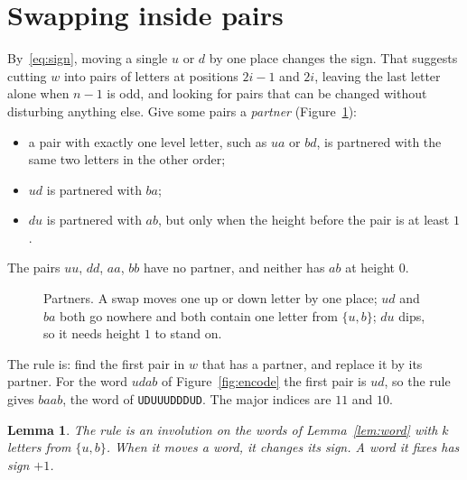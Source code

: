 \documentclass[11pt]{article}
\newtheorem{lemma}{Lemma}
\theoremstyle{remark}
\newcommand{\w}[1]{\texttt{#1}}
\begin{document}
\section{Swapping inside pairs}

By~\eqref{eq:sign}, moving a single $u$ or $d$ by one place changes the sign. That suggests cutting
$w$ into pairs of letters at positions $2i-1$ and $2i$, leaving the last letter alone when $n-1$ is
odd, and looking for pairs that can be changed without disturbing anything else. Give some pairs a
\emph{partner} (Figure~\ref{fig:partners}):
\begin{itemize}
\item a pair with exactly one level letter, such as $ua$ or $bd$, is partnered with the same two
letters in the other order;
\item $ud$ is partnered with $ba$;
\item $du$ is partnered with $ab$, but only when the height before the pair is at least $1$.
\end{itemize}
The pairs $uu$, $dd$, $aa$, $bb$ have no partner, and neither has $ab$ at height $0$.

\begin{figure}[ht]
\centering

\caption{Partners. A swap moves one up or down letter by one place; $ud$ and $ba$ both go
nowhere and both contain one letter from $\{u,b\}$; $du$ dips, so it needs height $1$ to stand on.}
\label{fig:partners}
\end{figure}

The rule is: find the first pair in $w$ that has a partner, and replace it by its partner. For
the word $udab$ of Figure~\ref{fig:encode} the first pair is $ud$, so the rule gives $baab$, the
word of \w{UDUUUDDDUD}. The major indices are $11$ and $10$.

\begin{lemma}\label{lem:swap}
The rule is an involution on the words of Lemma~\ref{lem:word} with $k$ letters from $\{u,b\}$.
When it moves a word, it changes its sign. A word it fixes has sign $+1$.
\end{lemma}
\end{document}

